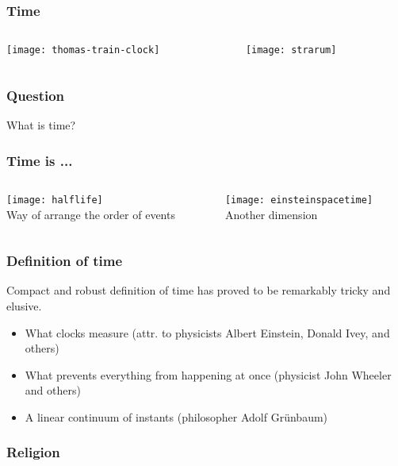 \documentclass[aspectratio=169, 15pt,usenames,dvipsnames]{beamer}
\begin{document}
{\begin{gdblank}
	\end{gdblank}
	\begin{gdblank}
		\frametitle{Time}
		\begin{columns}
			\begin{column}{0.5\textwidth}
				\centering\texttt{[image: thomas-train-clock]} 
			\end{column}
			\pause 
			\begin{column}{0.5\textwidth}
				\centering\texttt{[image: strarum]} 
			\end{column}
		\end{columns}            
	\end{gdblank}
	\begin{gdblank}
		\frametitle{Question}
		\centering\Huge What is time?           
	\end{gdblank} 
	\begin{gdblank}
		\frametitle{Time is ...}
		\begin{columns}
			\begin{column}{0.5\textwidth}
				\centering\texttt{[image: halflife]} 
				\\Way of arrange the order of events 
			\end{column}
			\pause 
			\begin{column}{0.5\textwidth}
				\centering\texttt{[image: einsteinspacetime]} 
				\\Another dimension
			\end{column}
		\end{columns} 
	\end{gdblank} 
	\begin{gdblank}
		\frametitle{Definition of time}
		\LARGE Compact and robust definition of time has proved to be remarkably tricky and elusive.
		\large
		\vskip1cm
		\begin{itemize}
			\item What clocks measure (attr. to physicists Albert Einstein, Donald Ivey, and others)
			      \pause
			\item What prevents everything from happening at once (physicist John Wheeler and others)
			\item A linear continuum of instants (philosopher Adolf Grünbaum)
		\end{itemize}
	\end{gdblank}
	\begin{gdblank}
		\frametitle{Religion}
		\begin{columns}
			\begin{column}{0.5\textwidth}

\end{column}
\end{columns}
\end{gdblank}}
\end{document}
